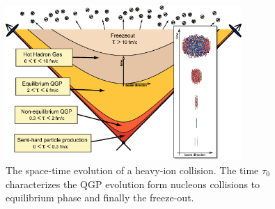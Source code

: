 \begin{figure}[h!]
\centering
 \includegraphics[width=0.8\textwidth] {FigCap1/timescales.png}
\caption{The space-time evolution of a heavy-ion collision. The time $\tau_0$ characterizes the QGP evolution form nucleons collisions to equilibrium phase and finally the freeze-out.}
\label{fig:QCDphase}
\end{figure}


